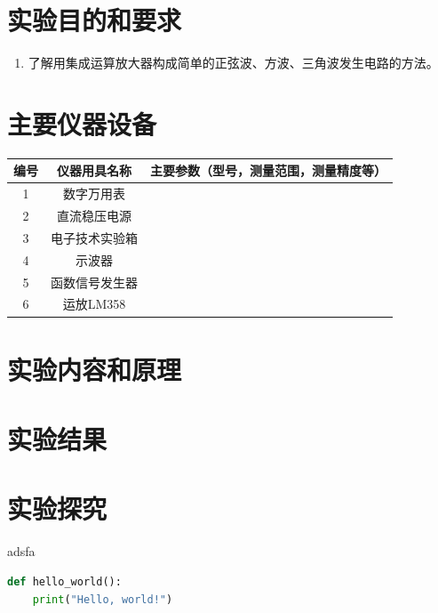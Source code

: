 \documentclass[12pt,a4paper,UTF8]{article}
\begin{document}

\maketoc    %
\section{实验目的和要求}
\begin{enumerate}
    \item 了解用集成运算放大器构成简单的正弦波、方波、三角波发生电路的方法。
\end{enumerate}

\section{主要仪器设备}
\begin{table}[htbp]
	  \centering
	    \begin{tabular}{ccp{20em}}
	    \toprule
	    编号    & 仪器用具名称     & 主要参数（型号，测量范围，测量精度等） \\
	    \midrule
	    1	&	数字万用表\\
	    2	&	直流稳压电源\\
	    3	&	电子技术实验箱\\
	    4	&	示波器\\
	    5	&	函数信号发生器\\
            6   &	运放LM358\\
	    \bottomrule
	    \end{tabular}%
	  \label{tab:device}%
    \end{table}%

\clearpage
\section{实验内容和原理}


\clearpage
\section{实验结果}


\clearpage
\section{实验探究}
\begin{problem}
adsfa
\end{problem}
\begin{solution}
\end{solution}
\begin{lstlisting}[language=Python, caption=Python example]
def hello_world():
    print("Hello, world!")
\end{lstlisting}
\end{document}
